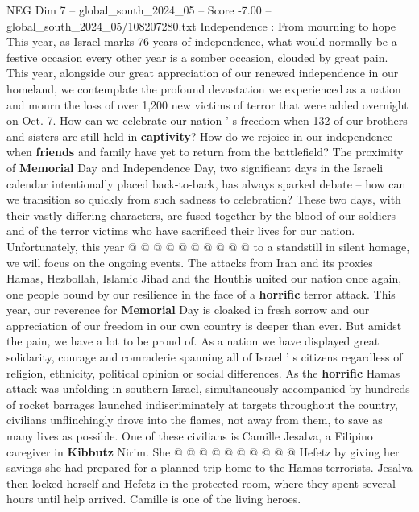 \begin{textsample}{NEG Dim 7 – global\_south\_2024\_05 – Score -7.00 – global\_south\_2024\_05/108207280.txt}  \label{ex:f7_neg_381}
Independence : From mourning to hope This year, as Israel marks 76 years of independence, what would normally be a festive occasion every other year is a somber occasion, clouded by great pain.
This year, alongside our great appreciation of our renewed independence in our homeland, we contemplate the profound devastation we experienced as a nation and mourn the loss of over 1,200 new victims of terror that were added overnight on Oct. 7.
How can we celebrate our nation ' s freedom when 132 of our brothers and sisters are still held in \textbf{captivity}?
How do we rejoice in our independence when \textbf{friends} and family have yet to return from the battlefield?
The proximity of \textbf{Memorial} Day and Independence Day, two significant days in the Israeli calendar intentionally placed back-to-back, has always sparked debate -- how can we transition so quickly from such sadness to celebration?
These two days, with their vastly differing characters, are fused together by the blood of our soldiers and of the terror victims who have sacrificed their lives for our nation.
Unfortunately, this year @ @ @ @ @ @ @ @ @ @ to a standstill in silent homage, we will focus on the ongoing events.
The attacks from Iran and its proxies Hamas, Hezbollah, Islamic Jihad and the Houthis united our nation once again, one people bound by our resilience in the face of a \textbf{horrific} terror attack.
This year, our reverence for \textbf{Memorial} Day is cloaked in fresh sorrow and our appreciation of our freedom in our own country is deeper than ever.
But amidst the pain, we have a lot to be proud of.
As a nation we have displayed great solidarity, courage and comraderie spanning all of Israel ' s citizens regardless of religion, ethnicity, political opinion or social differences.
As the \textbf{horrific} Hamas attack was unfolding in southern Israel, simultaneously accompanied by hundreds of rocket barrages launched indiscriminately at targets throughout the country, civilians unflinchingly drove into the flames, not away from them, to save as many lives as possible.
One of these civilians is Camille Jesalva, a Filipino caregiver in \textbf{Kibbutz} Nirim.
She @ @ @ @ @ @ @ @ @ @ Hefetz by giving her savings she had prepared for a planned trip home to the Hamas terrorists.
Jesalva then locked herself and Hefetz in the protected room, where they spent several hours until help arrived.
Camille is one of the living heroes.

\end{textsample}
